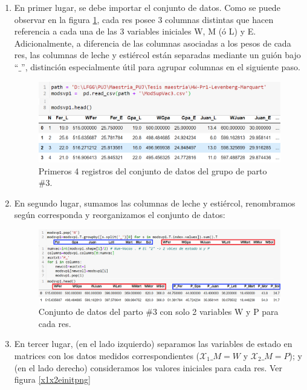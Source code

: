 \begin{enumerate}
    \item En primer lugar, se debe importar el conjunto de datos. Como se puede observar en la figura \ref{agrupmodpng}, cada res posee 3 columnas distintas que hacen referencia a cada una de las 3 variables iniciales W, M (ó L) y E. Adicionalmente, a diferencia de las columnas asociadas a los pesos de cada res, las columnas de leche y estiércol están separadas mediante un guión bajo ``$\_$'', distinción especialmente útil para agrupar columnas en el siguiente paso.
    
        \begin{figure}[H]
            \centering
            \includegraphics[width=\textwidth]{img/Agrupmod.png}
            \caption{Primeros 4 registros del conjunto de datos del grupo de parto \#3.}
            \label{agrupmodpng}
        \end{figure}

    \item En segundo lugar, sumamos las columnas de leche y estiércol, renombramos según corresponda y reorganizamos el conjunto de datos:

        \begin{figure}[H]
            \centering
            \includegraphics[width=\textwidth]{img/Agrupmod2d.png}
            \caption{Conjunto de datos del parto \#3 con solo 2 variables W y P para cada res.}
            \label{agrupmod2dpng}
        \end{figure}

    \item En tercer lugar, (en el lado izquierdo) separamos las variables de estado en matrices con los datos medidos correspondientes ($\mathcal{X}_1\_M=W$ y $\mathcal{X}_2\_M=P$); y (en el lado derecho)  consideramos los valores iniciales para cada res. Ver figura \ref{x1x2einitpng}


\end{enumerate}
